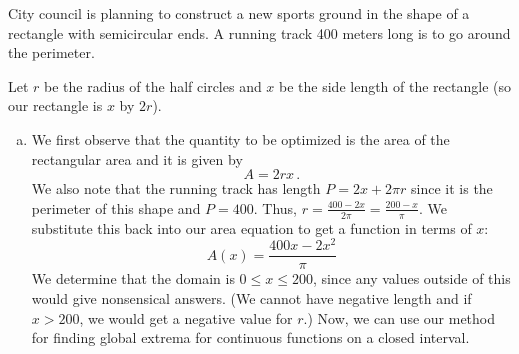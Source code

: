 \documentclass[11pt]{exam}
\begin{document}
\begin{questions}
\question City council is planning to construct a new sports ground in the shape of a
rectangle with semicircular ends. A running track 400 meters long is to go around
the perimeter.
\begin{solution}
  Let \(r\) be the radius of the half circles and \(x\) be the
  side length of the rectangle (so our rectangle is \(x\) by \(2r\)). 
  \begin{enumerate}[(a)]
  \item We first observe that the quantity to be optimized is the area
    of the rectangular area and it is
    given by \[
      A = 2rx \,.
    \]
    We also note that the running track has length \(P = 2x + 2\pi
    r\) since it is the perimeter of this shape and
    \(P=400\). Thus, \(r = \frac{400-2x}{2\pi} =
    \frac{200-x}{\pi}\). We substitute this back into our area
    equation to get a function in terms of \(x\):\[
      A(x) = \frac{400x-2x^2}{\pi}
    \]
    We determine that the domain is \(0 \leq x \leq 200\), since any
    values outside of this would give nonsensical answers. (We cannot
    have negative length and if \(x > 200\), we would get a negative
    value for \(r\).) Now, we can use our method for finding global
    extrema for continuous functions on a closed interval.


\end{enumerate}
\end{solution}
\end{questions}
\end{document}
